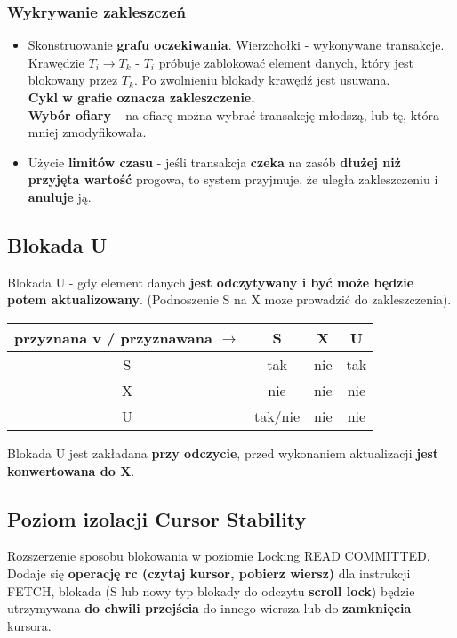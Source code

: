 \documentclass[a4paper]{article}
\begin{document}
\subsubsection{Wykrywanie zakleszczeń}
\begin{itemize}
    \item Skonstruowanie	 \textbf{grafu	 oczekiwania}. Wierzchołki - wykonywane transakcje. Krawędzie $T_i \rightarrow T_k$ - $T_i$ próbuje	zablokować	element	danych, który jest blokowany	 przez	$T_k$. Po zwolnieniu	blokady	krawędź	jest	usuwana.\\
    \textbf{Cykl	w	grafie	oznacza	zakleszczenie.}\\
    \textbf{Wybór	 ofiary}	 – na	 ofiarę	 można	 wybrać	 transakcję	 młodszą,	 lub	 tę,	 która	 mniej zmodyfikowała.	
    \item Użycie \textbf{limitów	czasu} - jeśli	transakcja	\textbf{czeka}	na	zasób	\textbf{dłużej	niż	przyjęta wartość}	progowa,	 to	 system	 przyjmuje,	 że	 uległa	 zakleszczeniu	 i	\textbf{anuluje}	ją.
\end{itemize}

\subsection{Blokada U}
Blokada	U - gdy element	danych	\textbf{jest odczytywany i być	może będzie	potem aktualizowany}. (Podnoszenie S na X moze prowadzić do zakleszczenia).\\
\begin{tabular}{|c|c|c|c|}
\hline
     przyznana v / przyznawana $\rightarrow$ & S & X & U \\
\hline
    S & tak & nie & tak\\
\hline
    X & nie & nie & nie\\
\hline
    U & tak/nie & nie & nie\\
\hline
\end{tabular}

Blokada	U	jest	zakładana	\textbf{przy odczycie}, przed	wykonaniem	aktualizacji \textbf{jest konwertowana do X}.

\subsection{Poziom izolacji Cursor Stability}
 Rozszerzenie sposobu blokowania w poziomie Locking READ COMMITTED. Dodaje się \textbf{operację rc (czytaj kursor,
pobierz wiersz)} dla instrukcji FETCH, blokada (S lub nowy typ blokady do odczytu \textbf{scroll lock}) będzie utrzymywana \textbf{do chwili przejścia} do innego wiersza lub do \textbf{zamknięcia} kursora.\\
\end{document}
